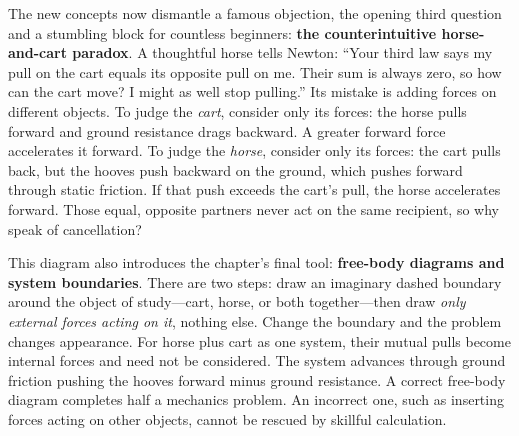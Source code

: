 The new concepts now dismantle a famous objection, the opening third question and a stumbling block for countless beginners: \textbf{the counterintuitive horse-and-cart paradox}. A thoughtful horse tells Newton: ``Your third law says my pull on the cart equals its opposite pull on me. Their sum is always zero, so how can the cart move? I might as well stop pulling.'' Its mistake is adding forces on different objects. To judge the \emph{cart}, consider only its forces: the horse pulls forward and ground resistance drags backward. A greater forward force accelerates it forward. To judge the \emph{horse}, consider only its forces: the cart pulls back, but the hooves push backward on the ground, which pushes forward through static friction. If that push exceeds the cart's pull, the horse accelerates forward. Those equal, opposite partners never act on the same recipient, so why speak of cancellation?

\begin{center}
\end{center}

This diagram also introduces the chapter's final tool: \textbf{free-body diagrams and system boundaries}. There are two steps: draw an imaginary dashed boundary around the object of study---cart, horse, or both together---then draw \emph{only external forces acting on it}, nothing else. Change the boundary and the problem changes appearance. For horse plus cart as one system, their mutual pulls become internal forces and need not be considered. The system advances through ground friction pushing the hooves forward minus ground resistance. A correct free-body diagram completes half a mechanics problem. An incorrect one, such as inserting forces acting on other objects, cannot be rescued by skillful calculation.

